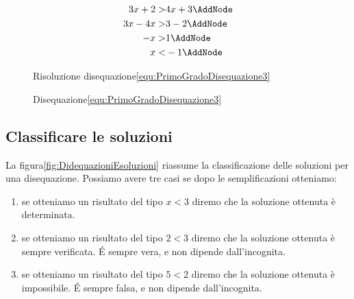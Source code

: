 \begin{figure}
	\begin{NodesList}
		\centering
		\begin{align*}
			3x+2>&4x+3\AddNode\\
			3x-4x>&3-2\AddNode\\
			-x>&1\AddNode\\
			x<&-1\AddNode
		\end{align*}
				\end{NodesList}
	\captionsetup{format=esempio,list=no}
	\caption{Risoluzione disequazione\nobs\vref{equ:PrimoGradoDisequazione3}}
	\label{fig:esempioDisequazioniPgrado3}
\end{figure}
\begin{figure}
	\centering
	\captionsetup{format=grafico,list=no}
	\caption{Disequazione\nobs\vref{equ:PrimoGradoDisequazione3}}
	\label{fig:esempioDisequazioniPgradografico3}
\end{figure}
\subsection{Classificare le soluzioni}
La figura\nobs\vref{fig:DidequazioniEsoluzioni} riassume la classificazione delle soluzioni per una disequazione. Possiamo avere tre casi se dopo le semplificazioni otteniamo:
\begin{enumerate}
	\item se otteniamo un risultato  del tipo $x<3$ diremo che la soluzione ottenuta è determinata.
	\item se otteniamo un risultato del tipo $2<3$ diremo che la soluzione ottenuta è sempre verificata. \'E sempre vera, e non dipende dall'incognita. 
	\item se otteniamo un risultato del tipo $5<2$ diremo che la soluzione ottenuta è impossibile. \'E sempre falsa, e non dipende dall'incognita.
\end{enumerate}
